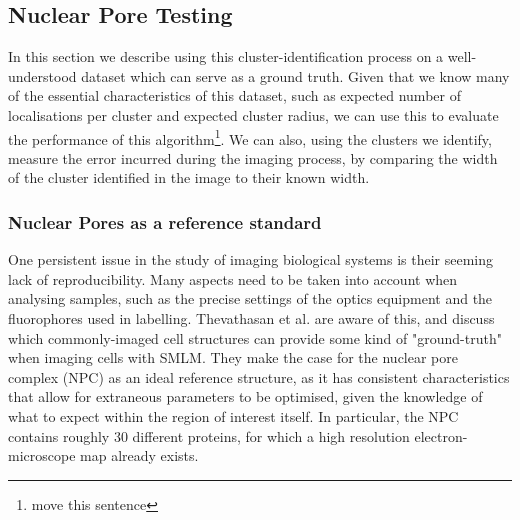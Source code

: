 \documentclass[11pt]{article}
\begin{document}
%



\subsection{Nuclear Pore Testing}




In this section we describe using this cluster-identification process on a well-understood dataset which can serve as a ground truth. Given that we know many of the essential characteristics of this dataset, such as expected number of localisations per cluster and expected cluster radius, we can use this to evaluate the performance of this algorithm\footnote{move this sentence}. We can also, using the clusters we identify, measure the error incurred during the imaging process, by comparing the width of the cluster identified in the image to their known width. \\


\subsubsection{Nuclear Pores as a reference standard}
\label{npReferenceStandard}

One persistent issue in the study of imaging biological systems is their seeming lack of reproducibility. Many aspects need to be taken into account when analysing samples, such as the precise settings of the optics equipment and the fluorophores used in labelling. Thevathasan et al. \cite{Thevathasan2019} are aware of this, and discuss which commonly-imaged cell structures can provide some kind of "ground-truth" when imaging cells with SMLM. They make the case for the nuclear pore complex (NPC) as an ideal reference structure, as it has consistent characteristics that allow for extraneous parameters to be optimised, given the knowledge of what to expect within the region of interest itself. In particular, the NPC contains roughly 30 different proteins, for which a high resolution electron-microscope map already exists.  \\
\end{document}
